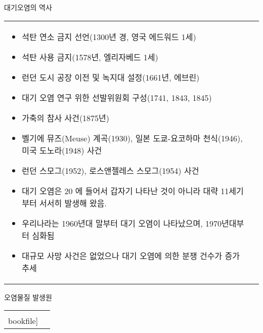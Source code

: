\begin{frame}[t]{대기오염의 역사}
	\begin{tabular}{ll}
		\begin{minipage}[t]{0.94\textwidth}\scriptsize
			\begin{itemize}
				\item 석탄 연소 금지 선언(1300년 경, 영국 에드워드 1세)
				\item 석탄 사용 금지(1578년, 엘리자베드 1세)
				\item 런던 도시 공장 이전 및 녹지대 설정(1661년, 에브린)
				\item 대기 오염 연구 위한 선발위원회 구성(1741, 1843, 1845)
				\item 가축의 참사 사건(1875년)
				\item 벨기에 뮤즈(Meuse) 계곡(1930), 일본 도쿄-요코하마 천식(1946), 미국 도노라(1948) 사건
				\item 런던 스모그(1952), 로스앤젤레스 스모그(1954) 사건
    			\item 대기 오염은 20 에 들어서 갑자기 나타난 것이 아니라 대략 11세기부터 서서히 발생해 왔음.
				\item 우리나라는 1960년대 말부터 대기 오염이 나타났으며, 1970년대부터 심화됨
				\item 대규모 사망 사건은 없었으나 대기 오염에 의한 분쟁 건수가 증가 추세
				
			\end{itemize}

		\end{minipage}	
		&
		\begin{minipage}[t]{0.01\textwidth} \scriptsize	
			
		\end{minipage}
	\end{tabular}
\end{frame}



\begin{frame}[t]{오염물질 발생원}
	\begin{tabular}{ll}
		\begin{minipage}[t]{0.6\textwidth}\scriptsize
			\begin{figure}[t]
				\texttt{[image: \\bookfile]}
			\end{figure}
		\end{minipage}	
		&
		\begin{minipage}[t]{0.35\textwidth} \scriptsize	
			

		\end{minipage}
	\end{tabular}
\end{frame}




